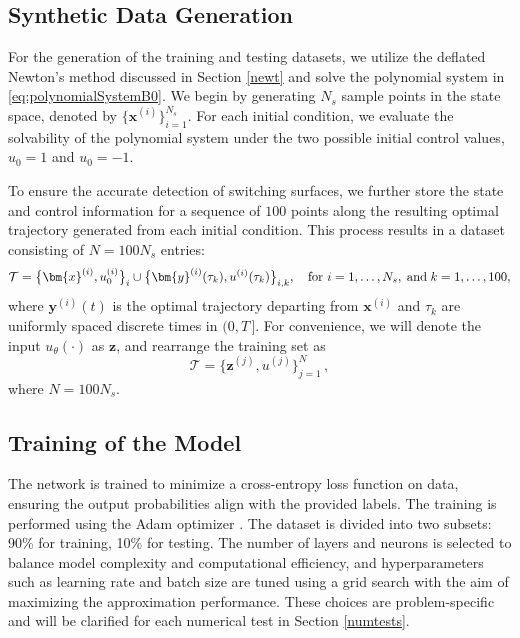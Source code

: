 \documentclass[11pt]{amsart}
\theoremstyle{definition}
\theoremstyle{remark}
\numberwithin{equation}{section}
\begin{document}
\subsection{Synthetic Data Generation}
For the generation of the training and testing datasets, we utilize the deflated Newton's method discussed in Section \ref{newt} and solve the polynomial system in \eqref{eq:polynomialSystemB0}. We begin by generating $N_s$ sample points in the state space, denoted by $\bigl\{\bm{x}^{(i)}\bigr\}_{i=1}^{N_s}$. For each initial condition, we evaluate the solvability of the polynomial system under the two possible initial control values, $u_0 = 1$ and $u_0 = -1$. 

To ensure the accurate detection of switching surfaces, we further store the state and control information for a sequence of $100$ points along the resulting optimal trajectory generated from each initial condition. This process results in a dataset consisting of $N = 100N_s$ entries:
\begin{equation*}
 \mathcal{T} = \bigl\{\bm{x}^{(i)}, u_0^{(i)}\bigr\}_{i}\cup\bigl\{\bm{y}^{(i)}(\tau_k), u^{(i)}(\tau_k)\bigr\}_{i,k}, \quad \text{for } i = 1,\dots,N_s,\; \text{and\;} k = 1,\dots,100,
\end{equation*}
where $\bm{y}^{(i)}(t)$ is the optimal trajectory departing from $\bm{x}^{(i)}$ and $\tau_k$ are uniformly spaced discrete times in $(0,T\,]$. For convenience, we will denote the input $u_\theta(\cdot)$ as $\bm{z}$, and rearrange the training set as 
\begin{equation*}
 \mathcal{T} = \bigl\{\bm{z}^{(j)}, u^{(j)}\bigr\}_{j=1}^{N}\,,
\end{equation*}
where $N=100N_s$.
\subsection{Training of the Model}
The network is trained to minimize a cross-entropy loss function on data, ensuring the output probabilities align with the provided labels. 
The training is performed using the Adam optimizer \cite{Adam}. The dataset is divided into two subsets: 90\% for training, 10\% for testing. The number of layers and neurons is selected to balance model complexity and computational efficiency, and hyperparameters such as learning rate and batch size are tuned using a grid search with the aim of maximizing the approximation performance. These choices are problem-specific and will be clarified for each numerical test in Section \ref{numtests}.
\end{document}
